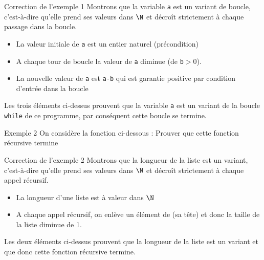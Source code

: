 \documentclass[10pt]{beamer}
\begin{document}
\begin{frame}[fragile]{\Ctitle}{\stitle}
\begin{exampleblock}{Correction de l'exemple 1}
    \textcolor{OliveGreen}{Montrons que la variable {\tt a} est un variant de boucle, c'est-à-dire qu'elle prend ses valeurs dans $\N$ et  décroît strictement à chaque passage dans la boucle.}
    \begin{itemize}
        \item<2->{\textcolor{OliveGreen}{La valeur initiale de \texttt{a} est un entier naturel (précondition)}}
        \item<3->{\textcolor{OliveGreen}{A chaque tour de boucle la valeur de \texttt{a} diminue (de \texttt{b}$>0$).}}
        \item<4->{\textcolor{OliveGreen}{La nouvelle valeur de \texttt{a} est \texttt{a-b} qui est garantie positive par condition d'entrée dans la boucle}}
    \end{itemize}
    \textcolor{OliveGreen}{Les trois éléments ci-dessus prouvent que la variable {\tt a} est un variant de la boucle {\tt while} de ce programme, par conséquent cette boucle se termine.}
\end{exampleblock}
\end{frame}

\begin{frame}[fragile]{\Ctitle}{\stitle}
    \begin{exampleblock}{Exemple 2}
        On considère la fonction ci-dessous :
         Prouver que cette fonction récursive termine
    \end{exampleblock}
    \end{frame}
    
    \begin{frame}[fragile]{\Ctitle}{\stitle}
    \begin{exampleblock}{Correction de l'exemple 2}
        \textcolor{OliveGreen}{Montrons que la longueur de la liste  est un variant, c'est-à-dire qu'elle prend ses valeurs dans $\N$ et  décroît strictement à chaque appel récursif.}
        \begin{itemize}
            \item<2->{\textcolor{OliveGreen}{La longueur d'une liste est à valeur dans $\N$}}
            \item<3->{\textcolor{OliveGreen}{A chaque appel récursif, on enlève un élément de  (sa tête) et donc la taille de la liste diminue de 1.}}
        \end{itemize}
        \textcolor{OliveGreen}{Les deux éléments ci-dessus prouvent que la longueur de la liste est un variant et que donc cette fonction récursive termine.}
    \end{exampleblock}
    \end{frame}
\end{document}
